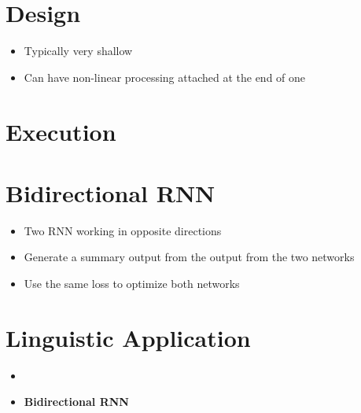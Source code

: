 \section{Design}

  \begin{itemize}
    \item Typically very shallow
    \item Can have non-linear processing attached at the end of one
  \end{itemize}

\section{Execution}

\section{Bidirectional RNN}

  \begin{itemize}
    \item Two RNN working in opposite directions
    \item Generate a summary output from the output from the two networks
    \item Use the same loss to optimize both networks
  \end{itemize}

\section{Linguistic Application}

  \begin{itemize}
    \item
    \item \textbf{Bidirectional RNN}
  \end{itemize}
